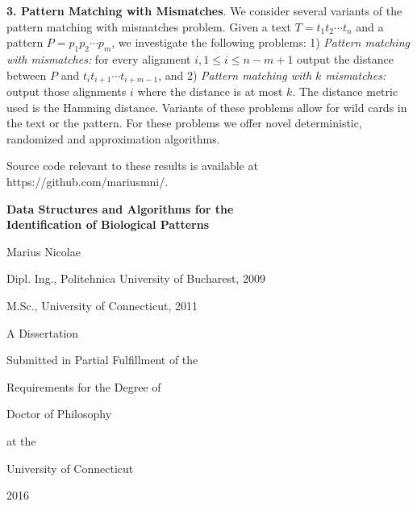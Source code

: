 \documentclass{report}
\newcommand{\thesisTitle}{{\bf Data Structures and Algorithms for the\\
Identification of Biological Patterns}}
\newcommand{\thesisAuthorName}{Marius Nicolae}
\begin{document}
        
{\bf 3. Pattern Matching with Mismatches}. We consider several
variants of the pattern matching with mismatches problem. Given a text $T=t_1
t_2\cdots t_n$ and a pattern $P=p_1p_2\cdots p_m$, we investigate the following problems: 
1) {\em Pattern matching with mismatches:} for every alignment $i, 1\leq i \leq
n-m+1$ output the distance between $P$ and $t_i t_{i+1}\cdots t_{i+m-1}$, and 
2) {\em Pattern matching with $k$ mismatches:} output those alignments $i$
where the distance is at most $k$. The distance metric used is the Hamming
distance. Variants of these problems allow for wild cards in
the text or the pattern. For these problems we offer novel deterministic,
randomized and approximation algorithms.

Source code relevant to these results is available at
https://github.com/mariusmni/.
\clearpage



\begin{center}
\begin{minipage}{\linewidth}
    \centering
    {\Large \thesisTitle \par}
    \vspace{1cm}
    {\Large \thesisAuthorName\par}
    \vspace{2cm}
    {\Large Dipl. Ing., Politehnica University of Bucharest, 2009\par}
    {\Large M.Sc., University of Connecticut, 2011\par}
    \vspace{5cm}

    {\Large A Dissertation\par}
    {\Large Submitted in Partial Fulfillment of the\par}
    {\Large Requirements for the Degree of\par}
    {\Large Doctor of Philosophy\par}
    {\Large at the\par}
    {\Large University of Connecticut\par}
    \vspace{1cm}
    {\Large 2016\par}
\end{minipage}
\end{center}
\clearpage
\end{document}

